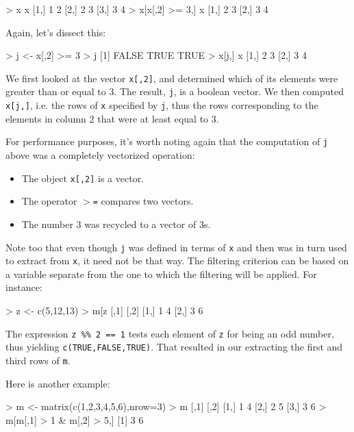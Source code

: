 \begin{Code}
> x
     x
[1,] 1 2
[2,] 2 3
[3,] 3 4
> x[x[,2] >= 3,]
     x
[1,] 2 3
[2,] 3 4
\end{Code}

\noindent
Again, let's dissect this:

\begin{Code}
> j <- x[,2] >= 3
> j
[1] FALSE  TRUE  TRUE
> x[j,]
     x
[1,] 2 3
[2,] 3 4
\end{Code}

We first looked at the vector {\tt x[,2]}, and determined which of its
elements were greater than or equal to 3.  The result, {\tt j}, is a
boolean vector.  We then computed {\tt x[j,]}, i.e. the rows of {\tt x}
specified by {\tt j}, thus the rows corresponding to the elements in
column 2 that were at least equal to 3.

For performance purposes, it's worth noting again that the computation
of {\tt j} above was a completely vectorized operation:

\begin{itemize}

\item The object {\tt x[,2]} is a vector.

\item The operator {\tt $>$=} compares two vectors.

\item The number 3 was recycled to a vector of 3s.

\end{itemize}

Note too that even though {\tt j} was defined in terms of {\tt x} and
then was in turn used to extract from {\tt x}, it need not be that way.
The filtering criterion can be based on a variable separate from the one
to which the filtering will be applied.  For instance:

\begin{Code}
> z <- c(5,12,13)
> m[z %
     [,1] [,2]
[1,]    1    4
[2,]    3    6
\end{Code}

The expression {\tt z \%\% 2 == 1} tests each element of {\tt z} for being
an odd number, thus yielding {\tt c(TRUE,FALSE,TRUE)}.  That resulted in
our extracting the first and third rows of {\tt m}.

Here is another example:

\begin{Code}
> m <- matrix(c(1,2,3,4,5,6),nrow=3)
> m
     [,1] [,2]
[1,]    1    4
[2,]    2    5
[3,]    3    6
> m[m[,1] > 1 & m[,2] > 5,]
[1] 3 6
\end{Code}

